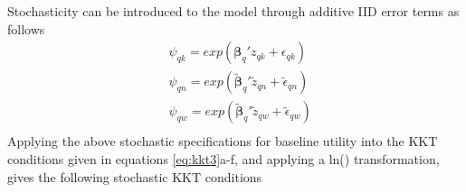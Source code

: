 Stochasticity can be introduced to the model through additive IID error terms as follows
\begin{subequations}\label{eq:out3}
    \begin{align}
    &\psi_{qk} = exp(\bm{\beta}_q' z_{qk} + \epsilon_{qk}) \\
    &\psi_{qn} = exp(\bm{\widetilde{\beta}}_q' \widetilde{z}_{qn} + \widetilde{\epsilon}_{qn}) \\
    &\psi_{qw} = exp(\bm{\widetilde{\beta}}_q' \widetilde{z}_{qw} + \widetilde{\epsilon}_{qw}) \\
    \end{align}
\end{subequations}
Applying the above stochastic specifications for baseline utility into the KKT conditions given in equations \ref{eq:kkt3}a-f, and applying a ln() transformation, gives the following stochastic KKT conditions
